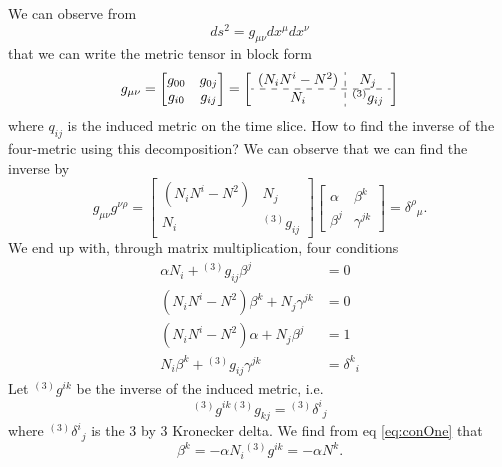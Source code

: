 We can observe from
\begin{equation}%
ds^2 = g_{\mu\nu}dx^{\mu}dx^{\nu} 
\end{equation}
that we can write the metric tensor in block form
\begin{equation}%
g_{\mu\nu} = \begin{bmatrix}
g_{00} & g_{0j}\\
g_{i0} & g_{ij}
\end{bmatrix} = \left[\begin{array}{c:c}
(N_{i}N^{i}-N^{2}) & N_{j}\\\hdashline
N_{i} & {}^{(3)}g_{ij}
\end{array}\right]
\end{equation}
where $q_{ij}$ is the induced metric on the time slice. How to
find the inverse of the four-metric using this decomposition? We
can observe that we can find the inverse by
\begin{equation}%
g_{\mu\nu}g^{\nu\rho} = \begin{bmatrix}
(N_{i}N^{i}-N^{2}) & N_{j}\\
N_{i} & {}^{(3)}g_{ij}
\end{bmatrix}
\begin{bmatrix}
\alpha & \beta^{k}\\
\beta^{j} & \gamma^{jk}
\end{bmatrix} = {\delta^{\rho}}_{\mu}.
\end{equation}
We end up with, through matrix multiplication, four conditions
\begin{subequations}
\begin{align}
\alpha N_i + {}^{(3)}g_{ij}\beta^{j} &= 0\label{eq:conOne}\\
(N_iN^i - N^2)\beta^k + N_j \gamma^{jk} &= 0\label{eq:conTwo}\\
(N_iN^i - N^2)\alpha + N_{j}\beta^{j} &= 1\label{eq:conThree}\\
N_{i}\beta^{k} + {}^{(3)}g_{ij}\gamma^{jk} &= {\delta^{k}}_{i}\label{eq:conFour}
\end{align}
\end{subequations}
Let ${}^{(3)}g^{ik}$ be the inverse of the induced metric, i.e.
\begin{equation}%
{}^{(3)}g^{ik}{}^{(3)}g_{kj}={}^{(3)}{\delta^{i}}_{j}
\end{equation}
where ${}^{(3)}{\delta^{i}}_{j}$ is the 3 by 3 Kronecker delta. We
find from eq \eqref{eq:conOne} that
\begin{equation}%
\beta^{k} = -\alpha N_{i}{}^{(3)}g^{ik} = -\alpha N^{k}.
\end{equation}
